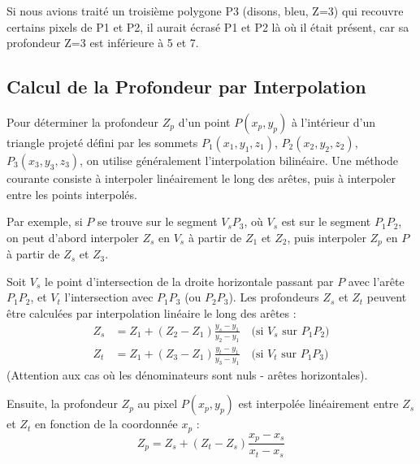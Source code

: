 \documentclass{article}
\begin{document}
Si nous avions traité un troisième polygone P3 (disons, bleu, Z=3) qui recouvre certains pixels de P1 et P2, il aurait écrasé P1 et P2 là où il était présent, car sa profondeur Z=3 est inférieure à 5 et 7.

\subsection{Calcul de la Profondeur par Interpolation}

Pour déterminer la profondeur $Z_p$ d'un point $P(x_p, y_p)$ à l'intérieur d'un triangle projeté défini par les sommets $P_1(x_1, y_1, z_1)$, $P_2(x_2, y_2, z_2)$, $P_3(x_3, y_3, z_3)$, on utilise généralement l'interpolation bilinéaire. Une méthode courante consiste à interpoler linéairement le long des arêtes, puis à interpoler entre les points interpolés.

Par exemple, si $P$ se trouve sur le segment $V_s P_3$, où $V_s$ est sur le segment $P_1 P_2$, on peut d'abord interpoler $Z_s$ en $V_s$ à partir de $Z_1$ et $Z_2$, puis interpoler $Z_p$ en $P$ à partir de $Z_s$ et $Z_3$.

Soit $V_s$ le point d'intersection de la droite horizontale passant par $P$ avec l'arête $P_1 P_2$, et $V_t$ l'intersection avec $P_1 P_3$ (ou $P_2 P_3$).
Les profondeurs $Z_s$ et $Z_t$ peuvent être calculées par interpolation linéaire le long des arêtes :
\begin{align*}
Z_s &= Z_1 + (Z_2 - Z_1) \frac{y_s - y_1}{y_2 - y_1} \quad \text{(si } V_s \text{ sur } P_1 P_2) \\
Z_t &= Z_1 + (Z_3 - Z_1) \frac{y_t - y_1}{y_3 - y_1} \quad \text{(si } V_t \text{ sur } P_1 P_3)
\end{align*}
(Attention aux cas où les dénominateurs sont nuls - arêtes horizontales).

Ensuite, la profondeur $Z_p$ au pixel $P(x_p, y_p)$ est interpolée linéairement entre $Z_s$ et $Z_t$ en fonction de la coordonnée $x_p$ :
\[ Z_p = Z_s + (Z_t - Z_s) \frac{x_p - x_s}{x_t - x_s} \]
\end{document}
